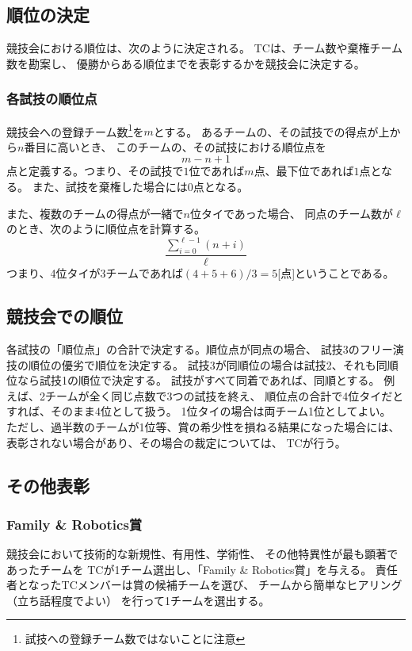 \documentclass[a4j]{jarticle}
\begin{document}
\subsection{順位の決定}

競技会における順位は、次のように決定される。
TCは、チーム数や棄権チーム数を勘案し、
優勝からある順位までを表彰するかを競技会に決定する。

\subsubsection{各試技の順位点}\label{sub:testrank}

競技会への登録チーム数\footnote{試技への登録チーム数ではないことに注意}を$m$とする。
あるチームの、その試技での得点が上から$n$番目に高いとき、
このチームの、その試技における順位点を
\[
	m - n + 1
\]
点と定義する。つまり、その試技で$1$位であれば$m$点、最下位であれば$1$点となる。
また、試技を棄権した場合には$0$点となる。

また、複数のチームの得点が一緒で$n$位タイであった場合、
同点のチーム数が$\ell$のとき、次のように順位点を計算する。
\[
	\dfrac{\sum_{i=0}^{\ell-1}(n + i)}{\ell}
\]
つまり、4位タイが3チームであれば$(4+5+6)/3=5$[点]ということである。


\subsection{競技会での順位}

各試技の「順位点」の合計で決定する。順位点が同点の場合、
試技3のフリー演技の順位の優劣で順位を決定する。
試技3が同順位の場合は試技2、それも同順位なら試技1の順位で決定する。
試技がすべて同着であれば、同順とする。
例えば、2チームが全く同じ点数で3つの試技を終え、
順位点の合計で4位タイだとすれば、そのまま4位として扱う。
1位タイの場合は両チーム1位としてよい。
ただし、過半数のチームが1位等、賞の希少性を損ねる結果になった場合には、
表彰されない場合があり、その場合の裁定については、
TCが行う。

\subsection{その他表彰}

\subsubsection{Family \& Robotics賞}

競技会において技術的な新規性、有用性、学術性、
その他特異性が最も顕著であったチームを
TCが1チーム選出し、「Family \& Robotics賞」を与える。
責任者となったTCメンバーは賞の候補チームを選び、
チームから簡単なヒアリング（立ち話程度でよい）
を行って1チームを選出する。
\end{document}
